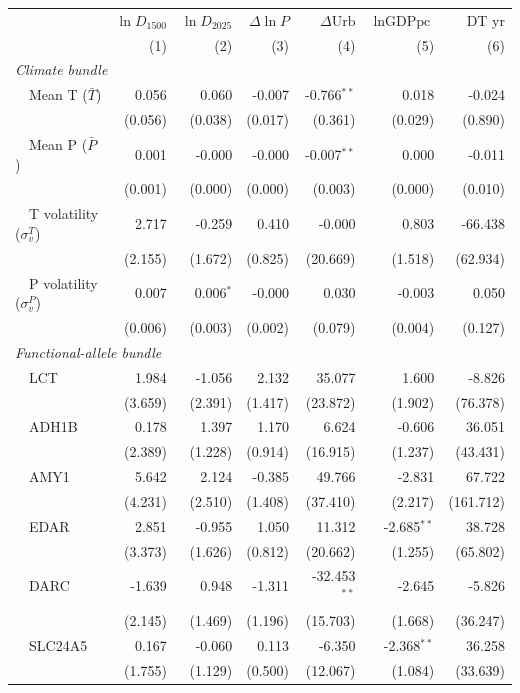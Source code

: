 \begin{tabular}{lrrrrrr}
\toprule
 & $\ln\!D_{1500}$ & $\ln\!D_{2025}$ & $\Delta\!\ln\!P$ & $\Delta\text{Urb}$ & $\ln\!\text{GDPpc}$ & DT yr \\
 & (1) & (2) & (3) & (4) & (5) & (6) \\
\midrule
\multicolumn{7}{l}{\textit{Climate bundle}} \\
~~Mean T ($\bar T$) & 0.056 & 0.060 & -0.007 & -0.766$^{**}$ & 0.018 & -0.024 \\
 & (0.056) & (0.038) & (0.017) & (0.361) & (0.029) & (0.890) \\
~~Mean P ($\bar P$) & 0.001 & -0.000 & -0.000 & -0.007$^{**}$ & 0.000 & -0.011 \\
 & (0.001) & (0.000) & (0.000) & (0.003) & (0.000) & (0.010) \\
~~T volatility ($\sigma_v^T$) & 2.717 & -0.259 & 0.410 & -0.000 & 0.803 & -66.438 \\
 & (2.155) & (1.672) & (0.825) & (20.669) & (1.518) & (62.934) \\
~~P volatility ($\sigma_v^P$) & 0.007 & 0.006$^{*}$ & -0.000 & 0.030 & -0.003 & 0.050 \\
 & (0.006) & (0.003) & (0.002) & (0.079) & (0.004) & (0.127) \\
\multicolumn{7}{l}{\textit{Functional-allele bundle}} \\
~~LCT & 1.984 & -1.056 & 2.132 & 35.077 & 1.600 & -8.826 \\
 & (3.659) & (2.391) & (1.417) & (23.872) & (1.902) & (76.378) \\
~~ADH1B & 0.178 & 1.397 & 1.170 & 6.624 & -0.606 & 36.051 \\
 & (2.389) & (1.228) & (0.914) & (16.915) & (1.237) & (43.431) \\
~~AMY1 & 5.642 & 2.124 & -0.385 & 49.766 & -2.831 & 67.722 \\
 & (4.231) & (2.510) & (1.408) & (37.410) & (2.217) & (161.712) \\
~~EDAR & 2.851 & -0.955 & 1.050 & 11.312 & -2.685$^{**}$ & 38.728 \\
 & (3.373) & (1.626) & (0.812) & (20.662) & (1.255) & (65.802) \\
~~DARC & -1.639 & 0.948 & -1.311 & -32.453$^{**}$ & -2.645 & -5.826 \\
 & (2.145) & (1.469) & (1.196) & (15.703) & (1.668) & (36.247) \\
~~SLC24A5 & 0.167 & -0.060 & 0.113 & -6.350 & -2.368$^{**}$ & 36.258 \\
 & (1.755) & (1.129) & (0.500) & (12.067) & (1.084) & (33.639) \\

\end{tabular}
